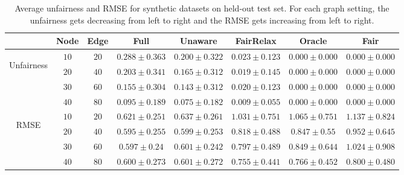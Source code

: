 \documentclass{article}
\begin{document}
\begin{table}[!ht]
\caption{Average unfairness and RMSE for synthetic datasets on held-out test set. For each graph setting, the unfairness gets decreasing from left to right and the RMSE gets increasing from left to right.}
\label{tab: RMSE and Unfairness for simultion data}
\begin{center}
\small
\begin{tabular}{cccccccc}
    \hline
           &Node &Edge   &Full     &Unaware  &FairRelax  &Oracle   &Fair\\ \hline
  \multirow{4}{*}{\begin{turn}{90}Unfairness\end{turn}}  &$10$   &$20$    &$0.288\pm0.363$ &$0.200\pm0.322$  &$0.023\pm0.123$ &$0.000\pm0.000$ &$0.000\pm0.000$ \\ %
            &$20$   &$40$    &$0.203\pm0.341$ &$0.165\pm0.312$ &$0.019\pm0.145$ &$0.000\pm0.000$ &$0.000\pm0.000$ \\ %
            &$30$   &$60$    &$0.155\pm0.304$ &$0.143\pm0.312$ &$0.020\pm0.123$ &$0.000\pm0.000$ &$0.000\pm0.000$ \\ %
            &$40$   &$80$    &$0.095\pm0.189$ &$0.075\pm0.182$ &$0.009\pm0.055$ &$0.000\pm0.000$ &$0.000\pm0.000$ \\ \hline\hline
    
    \multirow{4}{*}{\begin{turn}{90}RMSE\end{turn}}    &$10$   &$20$    &$0.621\pm0.251$   &$0.637\pm0.261$  &$1.031\pm0.751$   &$1.065\pm0.751$    &$1.137\pm0.824$ \\ %
            &$20$   &$40$    &$0.595\pm0.255$   &$0.599\pm0.253$   &$0.818\pm0.488$   &$0.847\pm0.55$    &$0.952\pm0.645$ \\ %
            &$30$   &$60$    &$0.597\pm0.24$    &$0.601\pm0.242$  &$0.797\pm0.489$    &$0.849\pm0.644$   &$1.024\pm0.908$\\ %
            &$40$   &$80$    &$0.600\pm0.273$     &$0.601\pm0.272$ &$0.755\pm0.441$    &$0.766\pm0.452$ &$0.800\pm0.480$ \\ \hline
\end{tabular}
\end{center}
\end{table}
\end{document}

